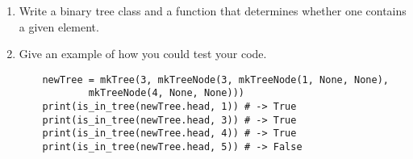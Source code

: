 \begin{enumerate}

\item Write a binary tree class and a function that determines whether one contains a given element.
\begin{answer}
	
\end{answer}

\item Give an example of how you could test your code.
\begin{answer}
\begin{lstlisting}
	newTree = mkTree(3, mkTreeNode(3, mkTreeNode(1, None, None),
			mkTreeNode(4, None, None)))
	print(is_in_tree(newTree.head, 1)) # -> True
	print(is_in_tree(newTree.head, 3)) # -> True
	print(is_in_tree(newTree.head, 4)) # -> True
	print(is_in_tree(newTree.head, 5)) # -> False
\end{lstlisting}
\end{answer}

\end{enumerate}
